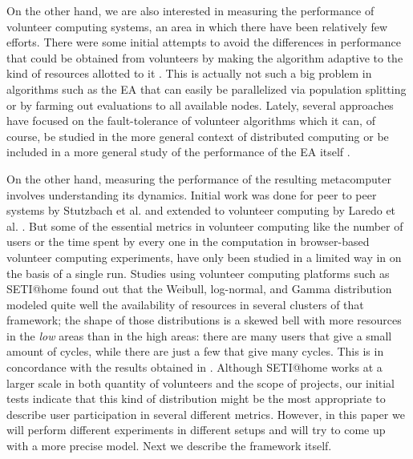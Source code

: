 \documentclass{sig-alternate}
\begin{document}
On the other hand, we are also interested in measuring the performance
of volunteer computing systems, an area in which there have been
relatively few efforts. There were some initial attempts to avoid the differences in performance
that could be obtained from volunteers  by making
the algorithm adaptive to the kind of resources allotted to it
\cite{milani2004online}. This is actually not such a big problem in
algorithms such as the EA that can easily be
parallelized via population splitting or by farming out evaluations to all
available nodes. Lately, several approaches have focused on the
fault-tolerance of volunteer algorithms
\cite{gonzalez2010characterizing} which it can, of course, be studied in
the more general context of distributed computing 
\cite{nogueras2015studying} or be included in a more general study of the
performance of the EA itself
\cite{DBLP:journals/gpem/LaredoBGVAGF14}.

On the other hand, measuring the performance of the resulting metacomputer
involves understanding its dynamics. Initial
work was done for peer to peer systems by Stutzbach et
al. \cite{stutzbach2006understanding} and extended to volunteer
computing by Laredo et al. \cite{churn08,laredo2008rcp}. 
But some of the essential metrics in volunteer computing like the
number of users or the time spent by every one in the
computation in browser-based volunteer computing experiments, have
only been studied in a limited way in 
\cite{DBLP:journals/gpem/LaredoBGVAGF14} on the basis of a single
run. Studies using volunteer computing platforms such as SETI@home
\cite{javadi2009mining} found out that the Weibull, log-normal, and
Gamma distribution 
modeled quite well the availability of resources in several clusters
of that framework; the shape of those distributions is a skewed bell
with more resources in the {\em low} areas than in the high areas:
there are many users that give a small amount of cycles, while there
are just a few that give many cycles. This is in concordance with the
results obtained in \cite{agajaj}. Although SETI@home works
at a larger scale in both quantity of volunteers and the scope of projects, 
our initial tests indicate that
this kind of distribution might be the most appropriate to describe
user participation in several different metrics. However, in this
paper we will perform different experiments in different setups and
will try to come up with a more precise model. Next we describe the
framework itself.
\end{document}
